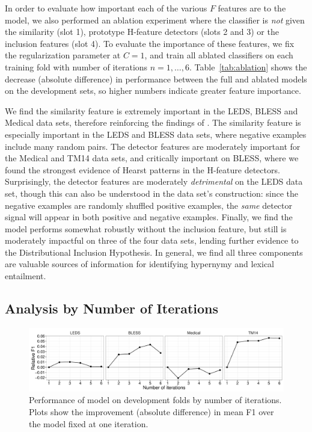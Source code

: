 In order to evaluate how important each of the various $F$ features are to the
model, we also performed an ablation experiment where the classifier is {\em
not} given the similarity (slot 1), prototype H-feature detectors (slots 2 and
3) or the inclusion features (slot 4). To evaluate the importance of these
features, we fix the regularization parameter at $C = 1$, and train all
ablated classifiers on each training fold with number of iterations
$n = {1, \ldots, 6}$. Table~\ref{tab:ablation} shows the decrease (absolute difference) in performance
between the full and ablated models on the development sets, so higher numbers indicate greater
feature importance.

We find the similarity feature is extremely important in the LEDS, BLESS and
Medical data sets, therefore reinforcing the findings of
. The similarity feature is especially important in
the LEDS and BLESS data sets, where negative examples include many random
pairs. The detector features are moderately important for the Medical and TM14 data sets,
and critically important on BLESS, where we found the strongest evidence
of Hearst patterns in the H-feature detectors.
Surprisingly, the detector features are moderately {\em detrimental} on the
LEDS data set, though this can also be understood in the data set's construction:
since the negative examples are randomly shuffled positive examples, the
{\em same} detector signal will appear in both positive and negative examples.
Finally, we find the model performs somewhat robustly without the inclusion
feature, but still is moderately impactful on three of the four data sets,
lending further evidence to the Distributional Inclusion Hypothesis.
In general, we find all three components are valuable sources of information
for identifying hypernymy and lexical entailment.

\subsection{Analysis by Number of Iterations}

\begin{figure}
  \begin{center}
  \includegraphics[width=1.00\textwidth]{plots/hpmbyiter}
\end{center}
\caption{Performance of model on development folds by number of iterations. Plots
show the improvement (absolute difference) in mean F1 over the model fixed at one
iteration.}
\label{fig:byiteration}
\end{figure}

